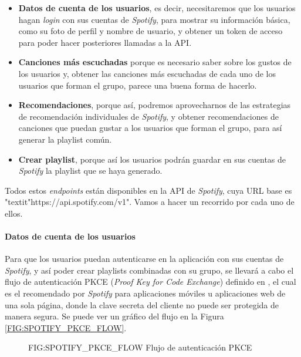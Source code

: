 \begin{itemize}
  \item \textbf{Datos de cuenta de los usuarios}, es decir, necesitaremos que los usuarios hagan 
  \textit{login} con sus cuentas de \textit{Spotify}, para mostrar su información básica, como su foto de
   perfil y nombre de usuario, y obtener un token de acceso para poder hacer posteriores llamadas a la API.
  \item \textbf{Canciones más escuchadas} porque es necesario saber sobre los gustos de los usuarios y,
  obtener las canciones más escuchadas de cada uno de los usuarios que forman el grupo, parece una buena forma de hacerlo.
  \item \textbf{Recomendaciones}, porque así, podremos aprovecharnos de las estrategias de recomendación 
  individuales de \textit{Spotify}, y obtener recomendaciones de canciones que puedan gustar a los usuarios 
  que forman el grupo, para así generar la playlist común.
  \item \textbf{Crear playlist}, porque así los usuarios podrán guardar en sus cuentas de \textit{Spotify} la
  playlist que se haya generado.
\end{itemize}

Todos estos \textit{endpoints} están disponibles en la API de \textit{Spotify}, cuya URL base es "textit{"https://api.spotify.com/v1}". Vamos a hacer un recorrido por cada uno de ellos.

\paragraph{Datos de cuenta de los usuarios\label{subsec:datos_cuenta_usuarios}}

Para que los usuarios puedan autenticarse en la aplicación con sus cuentas de \textit{Spotify}, y así poder crear playlists 
combinadas con su grupo, se llevará a cabo el flujo de autenticación PKCE 
(\textit{Proof Key for Code Exchange}) definido en \cite{spotify_pkce}, el cual es el recomendado por 
\textit{Spotify} para aplicaciones móviles u aplicaciones web de una sola página, donde la clave secreta
del cliente no puede ser protegida de manera segura. Se puede ver un gráfico del flujo en la Figura \ref{FIG:SPOTIFY_PKCE_FLOW}.

\begin{figure}[Flujo de autenticación PKCE]{FIG:SPOTIFY_PKCE_FLOW}
    {Flujo de autenticación PKCE}
\end{figure}

